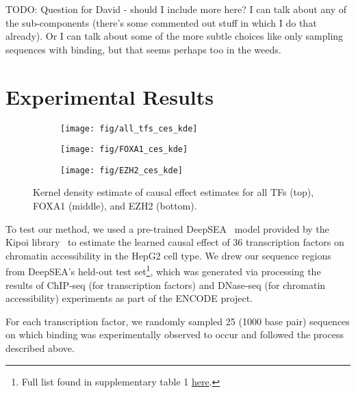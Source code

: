 \documentclass{article}
\begin{document}

TODO: Question for David - should I include more here? I can talk about any of the sub-components (there's some commented out stuff in which I do that already). Or I can talk about some of the more subtle choices like only sampling sequences with binding, but that seems perhaps too in the weeds.


\section{Experimental Results}
\begin{figure*}[ht]
\centering
\begin{subfigure}
\centering
\texttt{[image: fig/all\_tfs\_ces\_kde]}
\end{subfigure}%
\begin{subfigure}
\centering
\texttt{[image: fig/FOXA1\_ces\_kde]}
\label{fig:sub2}
\end{subfigure}
\begin{subfigure}
\centering
\texttt{[image: fig/EZH2\_ces\_kde]}
\end{subfigure}
\caption{Kernel density estimate of causal effect estimates for all TFs (top), FOXA1 (middle), and EZH2 (bottom).}
\label{fig:ces_kdes}
\end{figure*}
To test our method, we used a pre-trained DeepSEA~\cite{zhou2015predicting} model provided by the Kipoi library~\cite{avsec2019kipoi} to estimate the learned causal effect of 36 transcription factors on chromatin accessibility in the HepG2 cell type. We drew our sequence regions from DeepSEA's held-out test set\footnote{Full list found in supplementary table 1 \hyperlink{https://www.nature.com/articles/nmeth.3547\#Sec12}{here}.}, which was generated via processing the results of ChIP-seq (for transcription factors) and DNase-seq (for chromatin accessibility) experiments as part of the ENCODE project\cite{encode2004encode}.

For each transcription factor, we randomly sampled 25 (1000 base pair) sequences on which binding was experimentally observed to occur and followed the process described above. 
\end{document}
